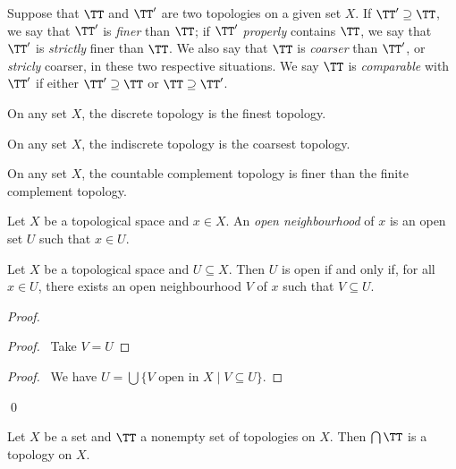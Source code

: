 \begin{definition}
    Suppose that $\TT$ and $\TT'$ are two topologies on a given set $X$. If $\TT' \supseteq \TT$, we say that $\TT'$ is \emph{finer} than
    $\TT$; if $\TT'$ \emph{properly} contains $\TT$, we say that $\TT'$ is \emph{strictly} finer than $\TT$. We also say that $\TT$ is
    \emph{coarser} than $\TT'$, or \emph{stricly} coarser, in these two respective situations. We say $\TT$ is \emph{comparable} with
    $\TT'$ if either $\TT' \supseteq \TT$ or $\TT \supseteq \TT'$.
\end{definition}

\begin{proposition}
    On any set $X$, the discrete topology is the finest topology.
\end{proposition}

\begin{proposition}
    On any set $X$, the indiscrete topology is the coarsest topology.
\end{proposition}

\begin{proposition}
    On any set $X$, the countable complement topology is finer than the finite complement topology.
\end{proposition}

\begin{definition}
    Let $X$ be a topological space and $x \in X$. An \emph{open neighbourhood} of $x$ is an open set $U$ such that $x \in U$.
\end{definition}

\begin{proposition}
    \label{proposition:open}
    Let $X$ be a topological space and $U \subseteq X$. Then $U$ is open if and only if, for all $x \in U$,
    there exists an open neighbourhood $V$ of $x$ such that $V \subseteq U$.
\end{proposition}

\begin{proof}
    \pf
    \begin{proof}
        \pf\ Take $V = U$
    \end{proof}
    \begin{proof}
        \pf\ We have $U = \bigcup \{ V \text{ open in } X \mid V \subseteq U \}$.
    \end{proof}
    \qed
\end{proof}

\begin{proposition}
    Let $X$ be a set and $\TT$ a nonempty set of topologies on $X$. Then $\bigcap \TT$ is a topology on $X$.
\end{proposition}

